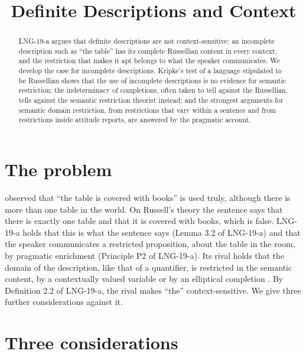\documentclass{situationist-preprint}
\title{Definite Descriptions and Context}
\begin{document}
\maketitle

\begin{abstract}
LNG-19-a argues that definite descriptions are not context-sensitive: an incomplete description such as \enquote{the table} has its complete Russellian content in every context, and the restriction that makes it apt belongs to what the speaker communicates. We develop the case for incomplete descriptions. Kripke's test of a language stipulated to be Russellian shows that the use of incomplete descriptions is no evidence for semantic restriction; the indeterminacy of completions, often taken to tell against the Russellian, tells against the semantic restriction theorist instead; and the strongest arguments for semantic domain restriction, from restrictions that vary within a sentence and from restrictions inside attitude reports, are answered by the pragmatic account.
\end{abstract}

\section{The problem}

\citet{Strawson1950} observed that \enquote{the table is covered with books} is used truly, although there is more than one table in the world. On Russell's theory the sentence says that there is exactly one table and that it is covered with books, which is false. LNG-19-a holds that this is what the sentence says (Lemma 3.2 of LNG-19-a) and that the speaker communicates a restricted proposition, about the table in the room, by pragmatic enrichment (Principle P2 of LNG-19-a). Its rival holds that the domain of the description, like that of a quantifier, is restricted in the semantic content, by a contextually valued variable or by an elliptical completion \citep{StanleySzabo2000}. By Definition 2.2 of LNG-19-a, the rival makes \enquote{the} context-sensitive. We give three further considerations against it.

\section{Three considerations}
\end{document}
